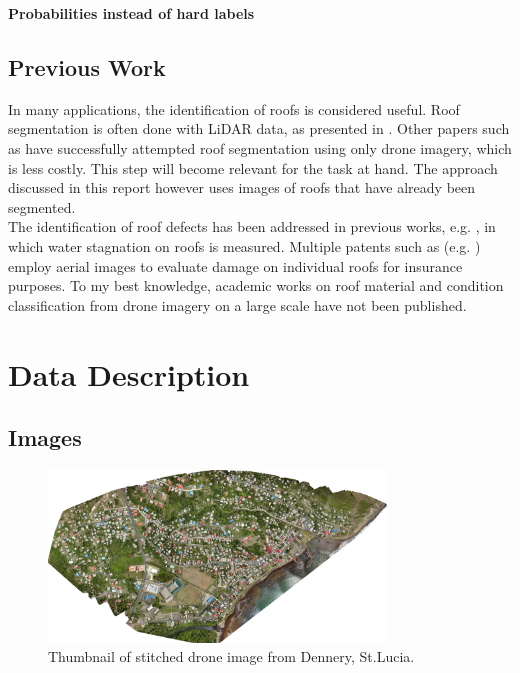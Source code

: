 \documentclass[11pt]{article}
\begin{document}
	\textbf{Probabilities instead of hard labels}
	
	\subsection{Previous Work}
	
	In many applications, the identification of roofs is considered useful. Roof segmentation is often done with LiDAR data, as presented in \cite{Chen2012}. Other papers such as \cite{Soman2019} have successfully attempted roof segmentation using only drone imagery, which is less costly. This step will become relevant for the task at hand. The approach discussed in this report however uses images of roofs that have already been segmented.\\
	
	The identification of roof defects has been addressed in previous works, e.g. \cite{Yudin2018}, in which water stagnation on roofs is measured. Multiple patents such as (e.g. \cite{Shreve2017}) employ aerial images to evaluate damage on individual roofs for insurance purposes. To my best knowledge, academic works on roof material and condition classification from drone imagery on a large scale have not been published. 
	
	\section{Data Description}
	
	\subsection{Images}
		
	\begin{figure}
		\centering		
		\includegraphics[width=0.8\textwidth]{figures/thumbnail_dennery.png}
		\caption{Thumbnail of stitched drone image from Dennery, St.Lucia.}
		\label{fig:thumbnail_dennery}
	\end{figure}
\end{document}

